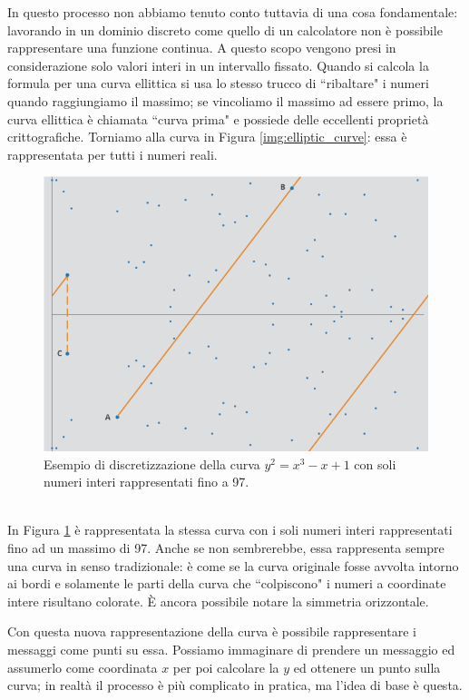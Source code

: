 In questo processo non abbiamo tenuto conto tuttavia di una cosa fondamentale: lavorando in un dominio discreto come quello di un calcolatore non è possibile rappresentare una funzione continua. A questo scopo vengono presi in considerazione solo valori interi in un intervallo fissato. Quando si calcola la formula per una curva ellittica si usa lo stesso trucco di \textquotedblleft ribaltare" i numeri quando raggiungiamo il massimo; se vincoliamo il massimo ad essere primo, la curva ellittica è chiamata \textquotedblleft curva prima" e possiede delle eccellenti proprietà crittografiche. Torniamo alla curva in Figura \ref{img:elliptic_curve}: essa è rappresentata per tutti i numeri reali.
\begin{figure}[htbp]
	\centering
	\includegraphics[scale = 0.5]{images/elliptic_curve_discrete}
	\caption{Esempio di discretizzazione della curva $y^2 = x^3 - x + 1$ con soli numeri interi rappresentati fino a 97.}
	\label{img:elliptic_curve_discrete}
\end{figure}\\
In Figura \ref{img:elliptic_curve_discrete} è rappresentata la stessa curva con i soli numeri interi rappresentati fino ad un massimo di 97. Anche se non sembrerebbe, essa rappresenta sempre una curva in senso tradizionale: è come se la curva originale fosse avvolta intorno ai bordi e solamente le parti della curva che \textquotedblleft colpiscono" i numeri a coordinate intere risultano colorate. È ancora possibile notare la simmetria orizzontale.

Con questa nuova rappresentazione della curva è possibile rappresentare i messaggi come punti su essa. Possiamo immaginare di prendere un messaggio ed assumerlo come coordinata $x$ per poi calcolare la $y$ ed ottenere un punto sulla curva; in realtà il processo è più complicato in pratica, ma l'idea di base è questa.


